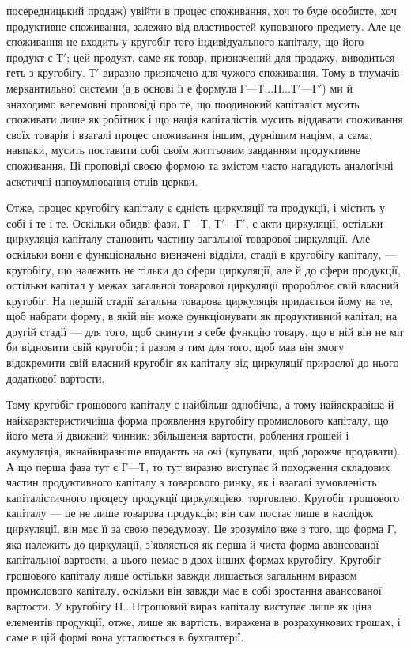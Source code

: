 \parcont{}  %
посередницький продаж) увійти в процес споживання, хоч то буде
особисте, хоч продуктивне споживання, залежно від властивостей купованого
предмету. Але це споживання не входить у кругобіг того індивідуального
капіталу, що його продукт є $Т'$; цей продукт, саме як товар,
призначений для продажу, виводиться геть з кругобігу. $Т'$ виразно
призначено для чужого споживання. Тому в тлумачів меркантильної
системи (а в основі її е формула $Г — Т... П... Т' — Г'$) ми й знаходимо
велемовні проповіді про те, що поодинокий капіталіст мусить споживати
лише як робітник і що нація капіталістів мусить віддавати споживання
своїх товарів і взагалі процес споживання іншим, дурнішим
націям, а сама, навпаки, мусить поставити собі своїм життьовим
завданням продуктивне споживання. Ці проповіді своєю формою та
змістом часто нагадують аналогічні аскетичні напоумлювання отців
церкви.

Отже, процес кругобігу капіталу є єдність циркуляції та продукції,
і містить у собі і те і те. Оскільки обидві фази, $Г — Т$, $Т' — Г'$, є акти
циркуляції, остільки циркуляція капіталу становить частину загальної
товарової циркуляції. Але оскільки вони є функціонально визначені відділи,
стадії в кругобігу капіталу, — кругобігу, що належить не тільки до
сфери циркуляції, але й до сфери продукції, остільки капітал у межах
загальної товарової циркуляції пророблює свій власний кругобіг. На першій
стадії загальна товарова циркуляція придається йому на те, щоб набрати
форму, в якій він може функціонувати як продуктивний капітал; на
другій стадії — для того, щоб скинути з себе функцію товару, що в ній
він не міг би відновити свій кругобіг; і разом з тим для того, щоб мав
він змогу відокремити свій власний кругобіг як капіталу від циркуляції
прирослої до нього додаткової вартости.

Тому кругобіг грошового капіталу є найбільш однобічна, а тому
найяскравіша й найхарактеристичиіша форма проявлення кругобігу промислового
капіталу, що його мета й движний чинник: збільшення вартости,
роблення грошей і акумуляція, якнайвиразніше впадають на очі (купувати,
щоб дорожче продавати). А що перша фаза тут є $Г — Т$, то тут
виразно виступає й походження складових частин продуктивного капіталу
з товарового ринку, як і взагалі зумовленість капіталістичного процесу
продукції циркуляцією, торговлею. Кругобіг грошового капіталу — це не
лише товарова продукція; він сам постає лише в наслідок циркуляції, він
має її за свою передумову. Це зрозуміло вже з того, що форма Г, яка
належить до циркуляції, з’являється як перша й чиста форма авансованої
капітальної вартости, а цього немає в двох інших формах кругобігу.
Кругобіг грошового капіталу лише остільки завжди лишається загальним
виразом промислового капіталу, оскільки він завжди має в собі зростання
авансованої вартости. У кругобігу $П... П г$рошовий вираз капіталу
виступає лише як ціна елементів продукції, отже, лише як вартість,
виражена в розрахункових грошах, і саме в цій формі вона усталюється
в бухгалтерії.
